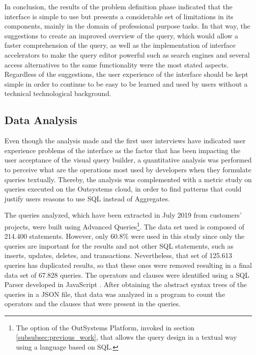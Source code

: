 In conclusion, the results of the problem definition phase indicated that the interface is simple to use but presents a considerable set of limitations in its components, mainly in the domain of professional purpose tasks. In that way, the suggestions to create an improved overview of the query, which would allow a faster comprehension of the query, as well as the implementation of interface accelerators to make the query editor powerful such as search engines and several access alternatives to the same functionality were the most stated aspects. Regardless of the suggestions, the user experience of the interface should be kept simple in order to continue to be easy to be learned and used by users without a technical technological background.

\subsection{Data Analysis}
\label{subsec:data_analysis}

Even though the analysis made and the first user interviews have indicated user experience problems of the interface as the factor that has been impacting the user acceptance of the visual query builder, a quantitative analysis was performed to perceive what are the operations most used by developers when they formulate queries textually. Thereby, the analysis was complemented with a metric study on queries executed on the Outsystems cloud, in order to find patterns that could justify users reasons to use \gls{SQL} instead of Aggregates. 

The queries analyzed, which have been extracted in July 2019 from customers’ projects, were built using Advanced Queries\footnote{The option of the OutSystems Platform, invoked in section \ref{subsubsec:previous_work}, that allows the query design in a textual way using a language based on \gls{SQL}.}. The data set used is composed of 214.400 statements. However, only 60.8\% were used in this study since only the queries are important for the results and not other SQL statements, such as inserts, updates, deletes, and transactions. Nevertheless, that set of 125.613 queries has duplicated results, so that these ones were removed resulting in a final data set of 67.828 queries. The operators and clauses were identified using a \gls{SQL} Parser developed in JavaScript \cite{jsSqlParser}. After obtaining the abstract syntax trees of the queries in a JSON file, that data was analyzed in a program to count the operators and the clauses that were present in the queries. 

